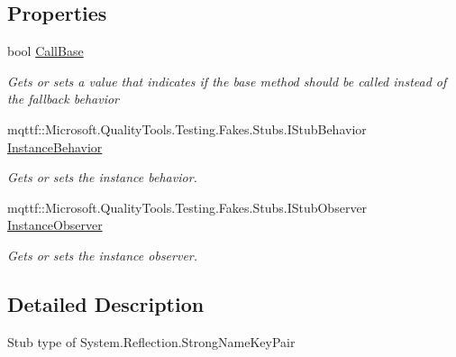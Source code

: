 \subsection*{Properties}
\begin{DoxyCompactItemize}
\item 
bool \hyperlink{class_system_1_1_reflection_1_1_fakes_1_1_stub_strong_name_key_pair_aa5901a0d96f9ec871c9bfde639e3058f}{Call\-Base}
\begin{DoxyCompactList}\small\item\em Gets or sets a value that indicates if the base method should be called instead of the fallback behavior\end{DoxyCompactList}\item 
mqttf\-::\-Microsoft.\-Quality\-Tools.\-Testing.\-Fakes.\-Stubs.\-I\-Stub\-Behavior \hyperlink{class_system_1_1_reflection_1_1_fakes_1_1_stub_strong_name_key_pair_ac6d39ae6d5635924076c4755a2fe3ac7}{Instance\-Behavior}
\begin{DoxyCompactList}\small\item\em Gets or sets the instance behavior.\end{DoxyCompactList}\item 
mqttf\-::\-Microsoft.\-Quality\-Tools.\-Testing.\-Fakes.\-Stubs.\-I\-Stub\-Observer \hyperlink{class_system_1_1_reflection_1_1_fakes_1_1_stub_strong_name_key_pair_aabab3ad50fa794d8d556623acb99514f}{Instance\-Observer}
\begin{DoxyCompactList}\small\item\em Gets or sets the instance observer.\end{DoxyCompactList}\end{DoxyCompactItemize}


\subsection{Detailed Description}
Stub type of System.\-Reflection.\-Strong\-Name\-Key\-Pair



